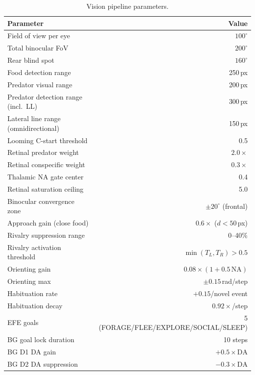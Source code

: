 \documentclass[11pt,a4paper]{article}
\begin{document}
\begin{table}[H]
\centering
\caption{Vision pipeline parameters.}
\label{tab:vision_params}
\small
\begin{tabular}{lr}
\toprule
Parameter & Value \\
\midrule
Field of view per eye                & $100^\circ$ \\
Total binocular FoV                  & $200^\circ$ \\
Rear blind spot                      & $160^\circ$ \\
Food detection range                 & 250\,px \\
Predator visual range                & 200\,px \\
Predator detection range (incl.\ LL) & 300\,px \\
Lateral line range (omnidirectional) & 150\,px \\
Looming C-start threshold            & 0.5 \\
Retinal predator weight              & $2.0\times$ \\
Retinal conspecific weight           & $0.3\times$ \\
Thalamic NA gate center              & 0.4 \\
Retinal saturation ceiling           & 5.0 \\
Binocular convergence zone           & $\pm20^\circ$ (frontal) \\
Approach gain (close food)           & $0.6\times$ ($d < 50$\,px) \\
Rivalry suppression range            & 0--40\% \\
Rivalry activation threshold         & $\min(T_L, T_R) > 0.5$ \\
Orienting gain                       & $0.08 \times (1 + 0.5\,\text{NA})$ \\
Orienting max                        & $\pm0.15$\,rad/step \\
Habituation rate                     & $+0.15$/novel event \\
Habituation decay                    & $0.92\times$/step \\
EFE goals                            & 5 (FORAGE/FLEE/EXPLORE/SOCIAL/SLEEP) \\
BG goal lock duration                & 10 steps \\
BG D1 DA gain                        & $+0.5 \times \text{DA}$ \\
BG D2 DA suppression                 & $-0.3 \times \text{DA}$ \\

\end{tabular}
\end{table}
\end{document}
